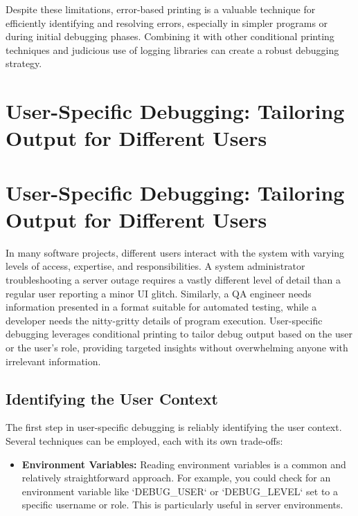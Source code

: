 \documentclass{article}
\begin{document}
{{{Despite these limitations, error-based printing is a valuable technique for efficiently identifying and resolving errors, especially in simpler programs or during initial debugging phases. Combining it with other conditional printing techniques and judicious use of logging libraries can create a robust debugging strategy.

\newpage

\section*{User-Specific Debugging: Tailoring Output for Different Users} %
\label{chapter-5-8-User-Specific_Debugging__Tailoring_Outpu}

\section*{User-Specific Debugging: Tailoring Output for Different Users}

In many software projects, different users interact with the system with varying levels of access, expertise, and responsibilities. A system administrator troubleshooting a server outage requires a vastly different level of detail than a regular user reporting a minor UI glitch.  Similarly, a QA engineer needs information presented in a format suitable for automated testing, while a developer needs the nitty-gritty details of program execution. User-specific debugging leverages conditional printing to tailor debug output based on the user or the user's role, providing targeted insights without overwhelming anyone with irrelevant information.

\subsection*{Identifying the User Context}

The first step in user-specific debugging is reliably identifying the user context. Several techniques can be employed, each with its own trade-offs:

\begin{itemize}
    \item \textbf{Environment Variables:} Reading environment variables is a common and relatively straightforward approach. For example, you could check for an environment variable like `DEBUG_USER` or `DEBUG_LEVEL` set to a specific username or role.  This is particularly useful in server environments.


\end{itemize}}}}
\end{document}
